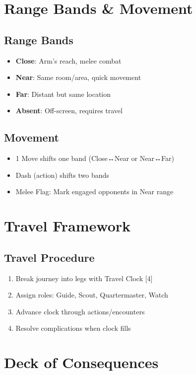 \documentclass[11pt]{article}
\begin{document}
\section{Range Bands \& Movement}

\subsection{Range Bands}
\begin{itemize}
    \item \textbf{Close}: Arm's reach, melee combat
    \item \textbf{Near}: Same room/area, quick movement
    \item \textbf{Far}: Distant but same location
    \item \textbf{Absent}: Off-screen, requires travel
\end{itemize}

\subsection{Movement}
\begin{itemize}
    \item 1 Move shifts one band (Close↔Near or Near↔Far)
    \item Dash (action) shifts two bands
    \item Melee Flag: Mark engaged opponents in Near range
\end{itemize}

\section{Travel Framework}

\subsection{Travel Procedure}
\begin{enumerate}
    \item Break journey into legs with Travel Clock [4]
    \item Assign roles: Guide, Scout, Quartermaster, Watch
    \item Advance clock through actions/encounters
    \item Resolve complications when clock fills
\end{enumerate}

\section{Deck of Consequences}
\end{document}

